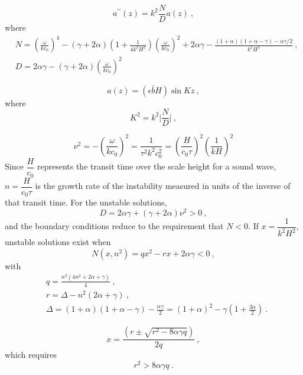 \documentclass[12pt,a4paper]{article}
\begin{document}
\begin{equation}
a^{\prime\prime}(z) = k^2 \frac{N}{D} a(z) ~,
\end{equation}
where
\begin{align}
& N = \left(\frac{\omega}{kc_0} \right)^4 -(\gamma +2\alpha)\left(1+\frac{1}{4k^2 H^2} \right) \left(\frac{\omega}{kc_0} \right)^2 +2\alpha \gamma -\frac{(1+\alpha)(1+\alpha-\gamma) -\alpha \gamma/2}{k^2 H^2} ~, \\
& D = 2\alpha \gamma -(\gamma +2\alpha)\left(\frac{\omega}{kc_0} \right)^2
\end{align}

\begin{equation}
a(z) = (\epsilon \bar{b} H ) \sin K z ~,
\end{equation}
where
\begin{equation*}
K^2 = k^2 \Big|\frac{N}{D} \Big| ~,
\end{equation*}

\begin{equation*}
\nu^2 = -\left(\frac{\omega}{k c_0} \right)^2 = \frac{1}{\tau^2 k^2 c^2_0} = \left(\frac{H}{c_0 \tau} \right)^2 \left(\frac{1}{k H} \right)^2 
\end{equation*}
Since $\dfrac{H}{c_0}$ represents the transit time over the scale height for a sound wave, $n = \dfrac{H}{c_0\tau}$ is the growth rate of the instability measured in units of the inverse of that transit time. For the unstable solutions,
\begin{equation*}
D = 2\alpha \gamma +(\gamma +2\alpha) \nu^2 > 0 ~,
\end{equation*}
and the boundary conditions reduce to the requirement that $N < 0$. If $x = \dfrac{1}{k^2H^2}$, unstable solutions exist when
\begin{equation}
N(x, n^2) = qx^2 -rx +2\alpha \gamma < 0 ~,
\end{equation}
with
\begin{align*}
& q = \frac{n^2(4n^2 +2\alpha +\gamma)}{4} ~,\\
& r = \Delta -n^2(2\alpha +\gamma) ~, \\
& \Delta = (1+\alpha)(1+\alpha-\gamma) -\frac{\alpha \gamma}{2} = (1+\alpha)^2 -\gamma(1+\frac{3\alpha}{2}) ~.
\end{align*}

\begin{equation}
x = \frac{(r \pm \sqrt{r^2 -8\alpha \gamma q} )}{2q} ~,
\end{equation}
which requires 
\begin{equation*}
r^2 > 8\alpha \gamma q ~.
\end{equation*}
\end{document}

